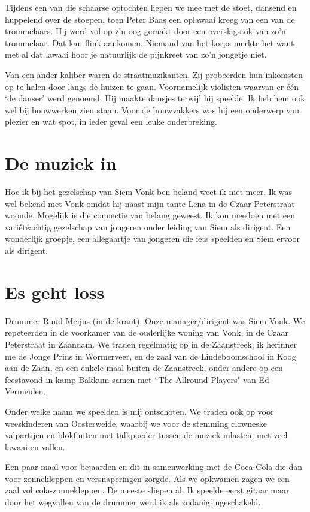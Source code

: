 \documentclass[10pt,twoside,openright]{memoir}
\begin{document}
Tijdens een van die schaarse optochten liepen we mee met de stoet, dansend en huppelend over de stoepen, toen Peter Baas een oplawaai kreeg van een van de trommelaars. Hij werd vol op z’n oog geraakt door een overslagstok van zo’n trommelaar. 
Dat kan flink aankomen. Niemand van het korps merkte het want met al dat lawaai hoor je natuurlijk de pijnkreet van zo’n jongetje niet.

Van een ander kaliber waren de straatmuzikanten. Zij probeerden hun inkomsten op te halen door langs de huizen te gaan. Voornamelijk violisten waarvan er één ‘de danser’ werd genoemd. Hij maakte dansjes terwijl hij speelde. Ik heb hem ook wel bij bouwwerken zien staan. Voor de bouwvakkers was hij een onderwerp van plezier en wat spot, in ieder geval een leuke onderbreking.

\chapter{De muziek in} %
\label{cha:muziek_in}

Hoe ik bij het gezelschap van Siem Vonk ben beland weet ik niet meer. Ik was wel bekend met Vonk omdat hij naast mijn tante Lena in de Czaar Peterstraat woonde. Mogelijk is die connectie van belang geweest. Ik kon meedoen met een variétéachtig gezelschap van jongeren onder leiding van Siem als dirigent. Een wonderlijk groepje, een allegaartje van jongeren die iets speelden en Siem ervoor als dirigent.

\chapter{Es geht loss} %
\label{cha:gehtloss}

Drummer Ruud Meijns (in de krant): Onze manager/dirigent was Siem Vonk. We repeteerden in de voorkamer van de ouderlijke woning van Vonk, in de Czaar Peterstraat in Zaandam. We traden regelmatig op in de Zaanstreek, ik herinner me de Jonge Prins in Wormerveer, en de zaal van de Lindeboomschool in Koog aan de Zaan, en een enkele maal buiten de Zaanstreek, onder andere op een feestavond in kamp Bakkum samen met ``The Allround Players" van Ed Vermeulen.

Onder welke naam we speelden is mij ontschoten. We traden ook op voor weeskinderen van Oosterweide, waarbij we voor de stemming clowneske valpartijen en blokfluiten met talkpoeder tussen de muziek inlasten, met veel lawaai en vallen. 

Een paar maal voor bejaarden en dit in samenwerking met de Coca-Cola die dan voor zonnekleppen en versnaperingen zorgde. Als we opkwamen zagen we een zaal vol cola-zonnekleppen. De meeste sliepen al. Ik speelde eerst gitaar maar door het wegvallen van de drummer werd ik als zodanig ingeschakeld. 
\end{document}
